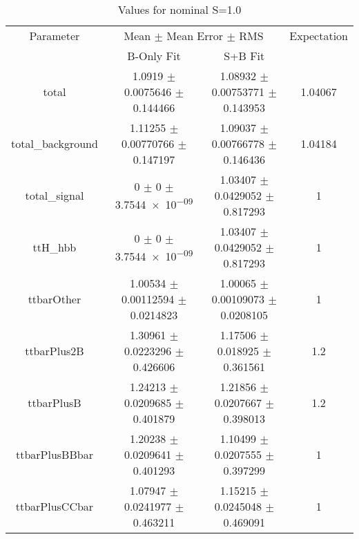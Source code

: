 \begin{table}
\centering
\caption{Values for nominal S=1.0}
\begin{tabular}{cccc}
\toprule
Parameter & \multicolumn{2}{c}{Mean $\pm$ Mean Error $\pm$ RMS} & Expectation\\
 & B-Only Fit & S+B Fit & \\
\midrule
total & \num{1.0919} $\pm$ \num{0.0075646} $\pm$ \num{0.144466} & \num{1.08932} $\pm$ \num{0.00753771} $\pm$ \num{0.143953} & \num{1.04067}\\
total\_background & \num{1.11255} $\pm$ \num{0.00770766} $\pm$ \num{0.147197} & \num{1.09037} $\pm$ \num{0.00766778} $\pm$ \num{0.146436} & \num{1.04184}\\
total\_signal & \num{0} $\pm$ \num{0} $\pm$ \num{3.7544e-09} & \num{1.03407} $\pm$ \num{0.0429052} $\pm$ \num{0.817293} & \num{1}\\
ttH\_hbb & \num{0} $\pm$ \num{0} $\pm$ \num{3.7544e-09} & \num{1.03407} $\pm$ \num{0.0429052} $\pm$ \num{0.817293} & \num{1}\\
ttbarOther & \num{1.00534} $\pm$ \num{0.00112594} $\pm$ \num{0.0214823} & \num{1.00065} $\pm$ \num{0.00109073} $\pm$ \num{0.0208105} & \num{1}\\
ttbarPlus2B & \num{1.30961} $\pm$ \num{0.0223296} $\pm$ \num{0.426606} & \num{1.17506} $\pm$ \num{0.018925} $\pm$ \num{0.361561} & \num{1.2}\\
ttbarPlusB & \num{1.24213} $\pm$ \num{0.0209685} $\pm$ \num{0.401879} & \num{1.21856} $\pm$ \num{0.0207667} $\pm$ \num{0.398013} & \num{1.2}\\
ttbarPlusBBbar & \num{1.20238} $\pm$ \num{0.0209641} $\pm$ \num{0.401293} & \num{1.10499} $\pm$ \num{0.0207555} $\pm$ \num{0.397299} & \num{1}\\
ttbarPlusCCbar & \num{1.07947} $\pm$ \num{0.0241977} $\pm$ \num{0.463211} & \num{1.15215} $\pm$ \num{0.0245048} $\pm$ \num{0.469091} & \num{1}\\
\bottomrule
\end{tabular}
\end{table}